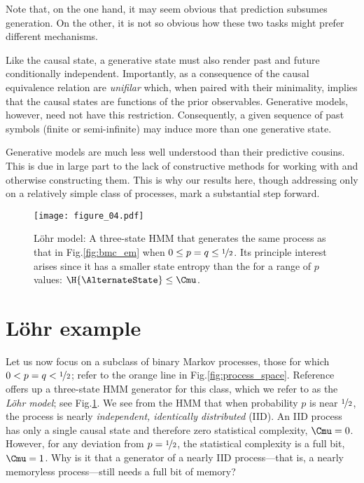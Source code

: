 \documentclass[final,nofootinbib,aps,pre,twocolumn,showpacs,groupaddress,preprintnumbers,floatfix]{revtex4-1}
\newcommand{\Lohr}{L{\"o}hr\xspace}
\begin{document}
Note that, on the one hand, it may seem obvious that prediction subsumes generation. On the other, it is not so obvious how these two tasks might
prefer different mechanisms.

Like the \eM causal state, a generative state \AlternateState must also render
past and future conditionally independent. Importantly, as a consequence of the
causal equivalence relation \eMs are \emph{unifilar} which, when paired with
their minimality, implies that the causal states are functions of the prior
observables. Generative models, however, need not have this restriction.
Consequently, a given sequence of past symbols (finite or semi-infinite) may
induce more than one generative state.

Generative models are much less well understood than their predictive cousins.
This is due in large part to the lack of constructive methods for working with
and otherwise constructing them. This is why our results here, though
addressing only on a relatively simple class of processes, mark a substantial
step forward.

\begin{figure}
\centering
\texttt{[image: figure\_04.pdf]}
 \caption{\Lohr model: A three-state HMM that generates the same process as
	that in Fig.\nobreakspace \ref {fig:bmc_em} when $0 \leq p = q \leq \nicefrac{1}{2}$. Its
	principle interest arises since it has a smaller state entropy than the
	\eM for a range of $p$ values: $\H{\AlternateState} \leq \Cmu$.
  }
\label{fig:lohr_machine}
\end{figure}

\section{\Lohr example}
\label{sec:lohr_example}

Let us now focus on a subclass of binary Markov processes, those for which $0 <
p = q < \nicefrac{1}{2}$; refer to the orange line in
Fig.\nobreakspace \ref {fig:process_space}.  Reference~\cite{Lohr09b} offers up a three-state HMM
generator for this class, which we refer to as the \emph{\Lohr model}; see
Fig.\nobreakspace \ref {fig:lohr_machine}. We see from the HMM that when probability $p$ is near
$\nicefrac{1}{2}$, the process is nearly \emph{independent, identically
distributed} (IID). An IID process has only a single causal state and therefore
zero statistical complexity, $\Cmu = 0$. However, for any deviation from $p =
\nicefrac{1}{2}$, the statistical complexity is a full bit, $\Cmu = 1$. Why is
it that a generator of a nearly IID process---that is, a nearly memoryless
process---still needs a full bit of memory?
\end{document}
